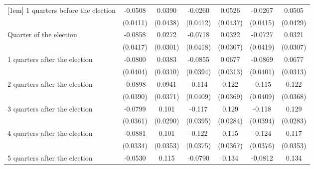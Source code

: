 \begin{table}[htbp]
\begin{tabular}{l*{6}{c}}
[1em]
 1 quarters before the election&     -0.0508         &      0.0390         &     -0.0260         &      0.0526         &     -0.0267         &      0.0505         \\
                    &    (0.0411)         &    (0.0438)         &    (0.0412)         &    (0.0437)         &    (0.0415)         &    (0.0429)         \\
[1em]
Quarter of the election&     -0.0858\sym{*}  &      0.0272         &     -0.0718         &      0.0322         &     -0.0727         &      0.0321         \\
                    &    (0.0417)         &    (0.0301)         &    (0.0418)         &    (0.0307)         &    (0.0419)         &    (0.0307)         \\
[1em]
 1 quarters after the election&     -0.0800\sym{*}  &      0.0383         &     -0.0855\sym{*}  &      0.0677\sym{*}  &     -0.0869\sym{*}  &      0.0677\sym{*}  \\
                    &    (0.0404)         &    (0.0310)         &    (0.0394)         &    (0.0313)         &    (0.0401)         &    (0.0313)         \\
[1em]
 2 quarters after the election&     -0.0898\sym{*}  &      0.0941\sym{*}  &      -0.114\sym{**} &       0.122\sym{***}&      -0.115\sym{**} &       0.122\sym{***}\\
                    &    (0.0390)         &    (0.0371)         &    (0.0409)         &    (0.0369)         &    (0.0409)         &    (0.0368)         \\
[1em]
 3 quarters after the election&     -0.0799\sym{*}  &       0.101\sym{***}&      -0.117\sym{**} &       0.129\sym{***}&      -0.118\sym{**} &       0.129\sym{***}\\
                    &    (0.0361)         &    (0.0290)         &    (0.0395)         &    (0.0284)         &    (0.0394)         &    (0.0283)         \\
[1em]
 4 quarters after the election&     -0.0881\sym{**} &       0.101\sym{**} &      -0.122\sym{**} &       0.115\sym{**} &      -0.124\sym{***}&       0.117\sym{***}\\
                    &    (0.0334)         &    (0.0353)         &    (0.0375)         &    (0.0367)         &    (0.0376)         &    (0.0353)         \\
[1em]
 5 quarters after the election&     -0.0530         &       0.115\sym{***}&     -0.0790\sym{*}  &       0.134\sym{***}&     -0.0812\sym{*}  &       0.134\sym{***}\\

\end{tabular}
\end{table}
